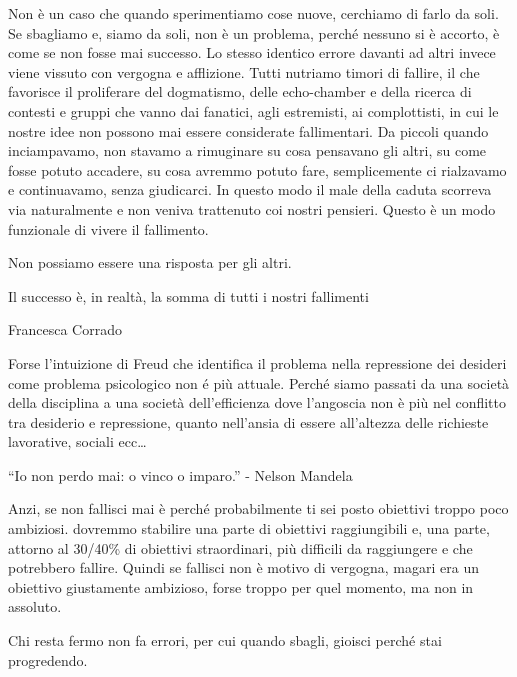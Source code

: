 \documentclass[12pt]{book} %
\begin{document}
\begin{mdframed}[linewidth=1pt]
Non è un caso che quando sperimentiamo cose nuove, cerchiamo di farlo da soli. Se sbagliamo e, siamo da soli, non è un
problema, perché nessuno si è accorto, è come se non fosse mai successo. Lo stesso identico errore davanti ad altri
invece viene vissuto con vergogna e afflizione. Tutti nutriamo timori di fallire, il che favorisce il proliferare del
dogmatismo, delle echo-chamber e della ricerca di contesti e gruppi che vanno dai fanatici, agli estremisti, ai
complottisti, in cui le nostre idee non possono mai essere considerate fallimentari. Da piccoli quando inciampavamo,
non stavamo a rimuginare su cosa pensavano gli altri, su come fosse potuto accadere, su cosa avremmo potuto fare,
semplicemente ci rialzavamo e continuavamo, senza giudicarci. In questo modo il male della caduta scorreva via
naturalmente e non veniva trattenuto coi nostri pensieri. Questo è un modo funzionale di vivere il fallimento.

Non possiamo essere una risposta per gli altri.


\bigskip

Il successo è, in realtà, la somma di tutti i nostri fallimenti

Francesca Corrado


\bigskip

Forse l'intuizione di Freud che identifica il problema nella repressione dei desideri come problema psicologico non é
più attuale. Perché siamo passati da una società della disciplina a una società dell'efficienza dove l'angoscia non è
più nel conflitto tra desiderio e repressione, quanto nell'ansia di essere all'altezza delle richieste lavorative,
sociali ecc…


\bigskip

“Io non perdo mai: o vinco o imparo.” - Nelson Mandela 


\bigskip

Anzi, se non fallisci mai è perché probabilmente ti sei posto obiettivi troppo poco ambiziosi. dovremmo stabilire una
parte di obiettivi raggiungibili e, una parte, attorno al 30/40\% di obiettivi straordinari, più difficili da
raggiungere e che potrebbero fallire. Quindi se fallisci non è motivo di vergogna, magari era un obiettivo giustamente
ambizioso, forse troppo per quel momento, ma non in assoluto. 

Chi resta fermo non fa errori, per cui quando sbagli, gioisci perché stai progredendo.
\end{mdframed}

\bigskip
\end{document}
